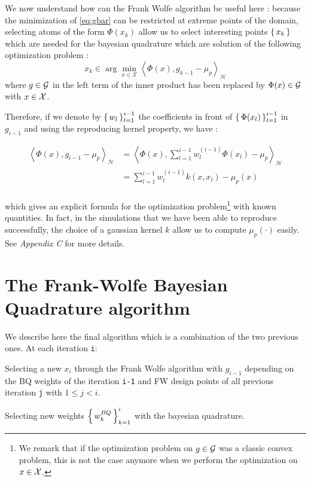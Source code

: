  We now understand how can the Frank Wolfe algorithm be useful here : because the
 minimization of \eqref{eq:gbar} can be restricted at extreme points of the domain,
 selecting atoms of the form $\Phi(x_k)$ allow us to select interesting points $\left \{ \, x_k \, \right \}$ which are needed for the bayesian quadrature which are solution of the
 following optimization problem :
 \begin{equation}\label{eq:xmin}
   x_k \in \arg \min _ { x \in \mathcal { X } } \left\langle \Phi ( x ) , g _ { k - 1 } - \mu _ { p } \right\rangle _ { \mathcal { H } }
 \end{equation}
 where $g \in \mathcal{G}$ in the left term of the inner product has been replaced by $\Phi(x) \in \mathcal{G}$ with $x \in \mathcal{X}$.

 Therefore, if we denote by $\left \{ \, w_l \, \right \}_{l=1}^{i-1}$ the coefficients in front of
 $\left \{ \, \Phi(x_l) \, \right \}_{l=1}^{i-1}$ in $g_{i-1}$ and using the reproducing kernel property, we have :
 \begin{boxcomputation}
   \begin{align*}
     \left\langle \Phi ( x ) , g _ { i - 1 } - \mu _ { p } \right\rangle _ { \mathcal { H } } &= \left\langle \Phi ( x ) , \sum _ { l = 1 } ^ { i - 1 } w _ { l } ^ { ( i - 1 ) } \Phi \left( x _ { l } \right) - \mu _ { p } \right\rangle _ { \mathcal { H } }\\
     &= \sum _ { l = 1 } ^ { i - 1 } w _ { l } ^ { ( i - 1 ) } k \left( x , x _ { l } \right) - \mu _ { p } ( x )\\
   \end{align*}
 \end{boxcomputation}
which gives an explicit formula for the optimization problem\footnote{We remark that if
 the optimization problem on $g \in \mathcal{G}$ was a classic convex problem, this is not the case anymore when we perform the optimization on $x \in \mathcal{X}$.} with known quantities.
 In fact, in the simulations that we have been able to reproduce successfully, the choice of a gaussian kernel $k$ allow us to compute $\mu_p( \cdot )$ easily. See \cite{FWBQ} \textit{Appendix C} for more details.
 \section{The Frank-Wolfe Bayesian Quadrature algorithm}
 \label{sec:CC}

We describe here the final algorithm which is a combination of the two previous
 ones.
    At each iteration \texttt{i}:
 \begin{mydescription}
   \item [Selecting a new $x_i$] through the Frank Wolfe algorithm with $g_{i-1}$ depending
   on the BQ weights of the iteration \texttt{i-1} and FW design points of all previous iteration \texttt{j} with $1 \leq j<i$.
   \item [Selecting new weights $\left \{ \, w_k^{BQ} \, \right \}_{k=1}^i$] with the bayesian quadrature.
 \end{mydescription}

